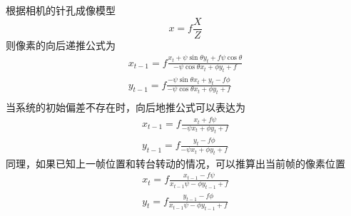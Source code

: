 根据相机的针孔成像模型
\begin{equation}
x = f \frac{X}{Z}
\end{equation}
则像素的向后递推公式为
\begin{align}
x_{t-1} = f\frac{x_t+\psi \sin \theta y_t + f\psi \cos \theta}{- \psi \cos \theta x_t + \phi y_t + f} \\
y_{t-1} = f\frac{-\psi \sin \theta x_t +y_t -f\phi}{- \psi \cos \theta x_t + \phi y_t + f} \\
\end{align}
当系统的初始偏差不存在时，向后地推公式可以表达为
\begin{align}
x_{t-1} = f\frac{x_t + f\psi }{- \psi  x_t  + \phi y_t + f} \\
y_{t-1} = f\frac{y_t -f\phi}{- \psi  x_t + \phi y_t + f}
\end{align}
同理，如果已知上一帧位置和转台转动的情况，可以推算出当前帧的像素位置
\begin{align}
x_{t} = f\frac{x_{t-1} - f\psi }{x_{t-1}  \psi  - \phi y_{t-1} + f} \\
y_{t} = f\frac{y_{t-1} -f\phi}{  x_{t-1} \psi - \phi y_{t-1} + f} \\
\end{align}

 



